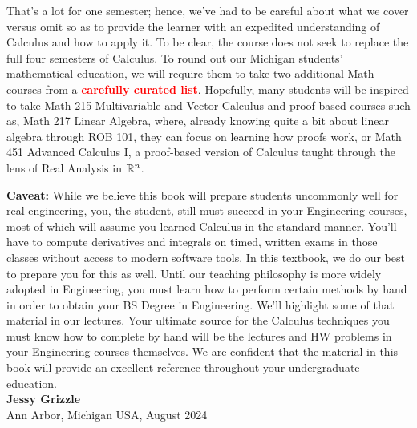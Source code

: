 That's a lot for one semester; hence, we've had to be careful about what we cover versus omit so as to provide the learner with an expedited understanding of Calculus and how to apply it. To be clear, the course does not seek to replace the full four semesters of Calculus. To round out our Michigan students' mathematical education, we will require them to take two additional Math courses from a \hyperlink{CuratedListCourses}{\textcolor{red}{\bf carefully curated list}}. Hopefully, many students will be inspired to take Math 215 Multivariable and Vector Calculus and proof-based courses such as, Math 217 Linear Algebra, where, already knowing quite a bit about linear algebra through ROB 101, they can focus on learning how proofs work, or Math 451 Advanced Calculus I, a proof-based version of Calculus taught through the lens of Real Analysis in $\mathbb R^n$.

\textbf{Caveat:} While we believe this book will prepare students uncommonly well for real engineering, you, the student, still must succeed in your Engineering courses, most of which will assume you learned Calculus in the standard manner. You'll have to compute derivatives and integrals on timed, written exams in those classes without access to modern software tools. In this textbook, we do our best to prepare you for this as well. Until our teaching philosophy is more widely adopted in Engineering, you must learn how to perform certain methods by hand in order to obtain your BS Degree in Engineering. We'll highlight some of that material in our lectures. Your ultimate source for the Calculus techniques you must know how to complete by hand will be the lectures and HW problems in your Engineering courses themselves. We are confident that the material in this book will provide an excellent reference throughout your undergraduate education.\\

\textbf{Jessy Grizzle}\\
Ann Arbor, Michigan USA, August 2024